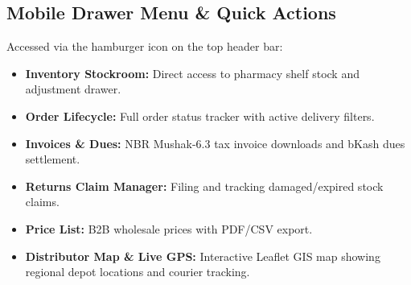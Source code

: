 \documentclass[10pt,a4paper]{article}
\begin{document}
\subsection{Mobile Drawer Menu \& Quick Actions}
Accessed via the hamburger icon on the top header bar:
\begin{itemize}[leftmargin=*]
    \item \textbf{Inventory Stockroom:} Direct access to pharmacy shelf stock and adjustment drawer.
    \item \textbf{Order Lifecycle:} Full order status tracker with active delivery filters.
    \item \textbf{Invoices \& Dues:} NBR Mushak-6.3 tax invoice downloads and bKash dues settlement.
    \item \textbf{Returns Claim Manager:} Filing and tracking damaged/expired stock claims.
    \item \textbf{Price List:} B2B wholesale prices with PDF/CSV export.
    \item \textbf{Distributor Map \& Live GPS:} Interactive Leaflet GIS map showing regional depot locations and courier tracking.
\end{itemize}

\end{document}
